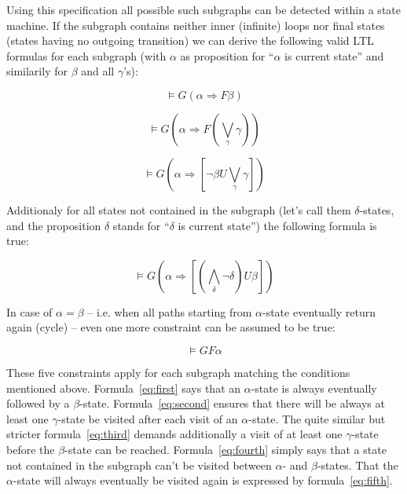 \documentclass[conference]{IEEEtran}
\begin{document}
Using this specification all possible such subgraphs can be detected within a state machine. If the subgraph contains neither inner (infinite) loops nor final states (states having no outgoing transition) we can derive the following valid LTL formulas for each subgraph (with $\alpha$ as proposition for ``$\alpha$ is current state'' and similarily for $\beta$ and all $\gamma$'s):

\begin{equation} \label{eq:first}
  \models G (\alpha \Rightarrow F \beta)
\end{equation}

\begin{equation} \label{eq:second}
  \models G (\alpha \Rightarrow F (\bigvee_{\gamma} \gamma))
\end{equation}

\begin{equation} \label{eq:third}
  \models G (\alpha \Rightarrow [\neg \beta U \bigvee_{\gamma} \gamma])
\end{equation}

Additionaly for all states not contained in the subgraph (let's call them $\delta$-states, and the proposition $\delta$ stands for ``$\delta$ is current state'') the following formula is true: 

\begin{equation} \label{eq:fourth}
  \models G (\alpha \Rightarrow [(\bigwedge_{\delta} \neg \delta) U \beta])
\end{equation}

In case of $\alpha = \beta$ -- i.e. when all paths starting from $\alpha$-state eventually return again (cycle) -- even one more constraint can be assumed to be true:

\begin{equation} \label{eq:fifth}
  \models G F \alpha
\end{equation}
 

These five constraints apply for each subgraph matching the conditions mentioned above. Formula~\ref{eq:first} says that an $\alpha$-state is always eventually followed by a $\beta$-state. Formula~\ref{eq:second} ensures that there will be always at least one $\gamma$-state be visited after each visit of an $\alpha$-state. The quite similar but stricter formula~\ref{eq:third} demands additionally a visit of at least one $\gamma$-state before the $\beta$-state can be reached. Formula~\ref{eq:fourth} simply says that a state not contained in the subgraph can't be visited between $\alpha$- and $\beta$-states. That the $\alpha$-state will always eventually be visited again is expressed by formula~\ref{eq:fifth}.
\end{document}
